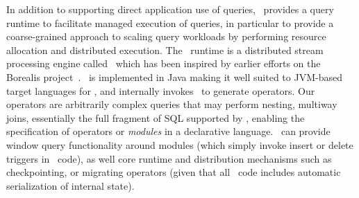 In addition to supporting direct application use of queries, \compiler\ provides
a query runtime to facilitate managed execution of queries, in particular to
provide a coarse-grained approach to scaling query workloads by performing
resource allocation and distributed execution. The \compiler\ runtime is a
distributed stream processing engine called \spe\ which has been inspired by
earlier efforts on the Borealis project~\todo{[CIDR 05]}. \spe\ is
implemented in Java making it well suited to JVM-based target
languages for \compiler, and internally invokes \compiler\ to generate
operators. Our operators are arbitrarily complex queries that may
perform nesting, multiway joins, essentially the full fragment of SQL
supported by \compiler, enabling the specification of operators or
\textit{modules} in a declarative language. \spe\ can provide window query
functionality around modules (which simply invoke insert or delete triggers in
\compiler\ code), as well core runtime and distribution mechanisms such as
checkpointing, or migrating operators (given that all \compiler\ code includes
automatic serialization of internal state).


